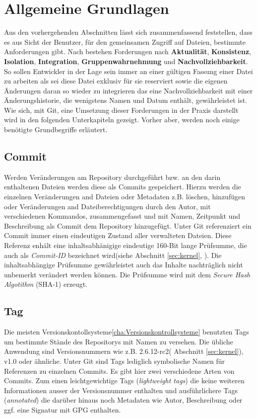 \section{Allgemeine Grundlagen}\label{sec:Grundlagen}
Aus den vorhergehenden Abschnitten lässt sich zusammenfassend feststellen, dass
es aus Sicht der Benutzer, für den gemeinsamen Zugriff auf Dateien, bestimmte
Anforderungen gibt. Nach \cite[S.~37]{hagen:1678} bestehen Forderungen nach
\textbf{Aktualität}, \textbf{Konsistenz}, \textbf{Isolation},
\textbf{Integration}, \textbf{Gruppenwahrnehmung} und
\textbf{Nachvollziehbarkeit}. So sollen Entwickler in der Lage sein immer an
einer gültigen Fassung einer Datei zu arbeiten als sei diese Datei exklusiv für
sie reserviert sowie die eigenen Änderungen daran so wieder zu integrieren das
eine Nachvollziehbarkeit mit einer Änderungshistorie, die wenigstens Namen und
Datum enthält, gewährleistet ist. Wie sich, mit Git, eine Umsetzung dieser
Forderungen in der Praxis darstellt wird in den folgenden Unterkapiteln
gezeigt. Vorher aber, werden noch einige benötigte Grundbegriffe erläutert.

\subsection{Commit}\label{sec:commit}
Werden Veränderungen am Repository durchgeführt bzw. an den darin enthaltenen
Dateien werden diese als Commits gespeichert. Hierzu werden die einzelnen
Veränderungen and Dateien oder Metadaten z.B. löschen, hinzufügen oder
Veränderungen and Dateiberechtigungen durch den Autor, mit verschiedenen
Kommandos, zusammengefasst und mit Namen, Zeitpunkt und Beschreibung als Commit
dem Repository hinzugefügt. Unter Git referenziert ein Commit immer einen
eindeutigen Zustand aller verwalteten Dateien. Diese Referenz enhält eine
inhaltsabhänigige eindeutige 160-Bit lange Prüfsumme, die auch als
\textit{Commit-ID} bezeichnet wird(siehe Abschnitt \ref{sec:kernel},
\pageref{sec:kernel}). Die inhaltsabhängige Prüfsumme gewährleistet auch das
Inhalte nachträglich nicht unbemerkt verändert werden können. Die Prüfsumme
wird mit dem \textit{Secure Hash Algotithm} (\gls{SHA-1})
erzeugt.\cite[S.~20-21]{gitos}

\subsection{Tag}\label{sec:tag}
Die meisten Versionskontollsysteme\ref{cha:Versionskontrollsysteme} benutzten
Tags um bestimmte Stände des Repositorys mit Namen zu versehen. Die übliche
Anwendung sind Versionsnummern wie z.B. 2.6.12-rc2( Abschnitt
\ref{sec:kernel}), v1.0 oder ähnliche. Unter Git sind Tags
lediglich symbolische Namen für Referenzen zu einzelnen Commits. Es gibt hier
zwei verschiedene Arten von Commits. Zum einen leichtgewichtige Tags
(\textit{lightweight tags}) die keine weiteren Informationen ausser der
Versionsnummer enthalten und ausführlichere Tags (\textit{annotated}) die
darüber hinaus noch Metadaten wie Autor, Beschreibung oder ggf. eine Signatur
mit GPG enthalten.\cite[S.~48]{progit}

